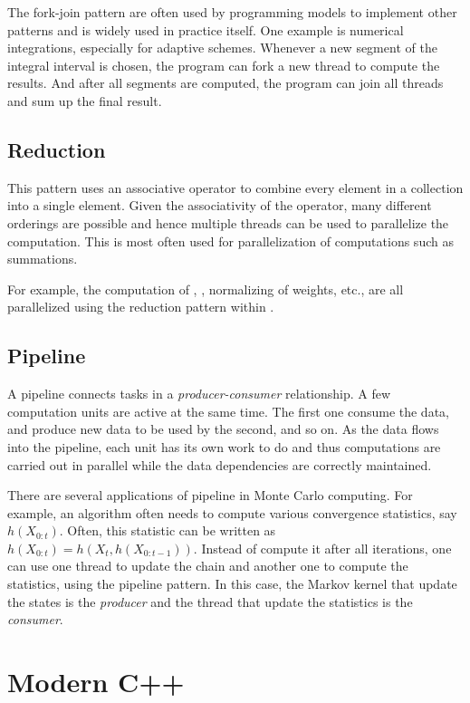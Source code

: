 The fork-join pattern are often used by programming models to implement other
patterns and is widely used in practice itself. One example is numerical
integrations, especially for adaptive schemes. Whenever a new segment of the
integral interval is chosen, the program can fork a new thread to compute the
results. And after all segments are computed, the program can join all threads
and sum up the final result.

\subsection{Reduction}
\label{sub:Reduction}

This pattern uses an associative operator to combine every element in a
collection into a single element. Given the associativity of the operator,
many different orderings are possible and hence multiple threads can be used
to parallelize the computation. This is most often used for parallelization of
computations such as summations.

For example, the computation of \ess, \cess, normalizing of weights, etc., are
all parallelized using the reduction pattern within \vsmc.

\subsection{Pipeline}
\label{sub:Pipeline}

A pipeline connects tasks in a \emph{producer-consumer} relationship. A few
computation units are active at the same time. The first one consume the data,
and produce new data to be used by the second, and so on. As the data flows
into the pipeline, each unit has its own work to do and thus computations are
carried out in parallel while the data dependencies are correctly maintained.

There are several applications of pipeline in Monte Carlo computing. For
example, an \mcmc algorithm often needs to compute various convergence
statistics, say $h(X_{0:t})$. Often, this statistic can be written as
$h(X_{0:t}) = h(X_t, h(X_{0:{t-1}}))$. Instead of compute it after all
iterations, one can use one thread to update the \mcmc chain and another one
to compute the statistics, using the pipeline pattern. In this case, the
Markov kernel that update the states is the \emph{producer} and the thread
that update the statistics is the \emph{consumer}.

\section{Modern C++}
\label{sec:Modern C++}

